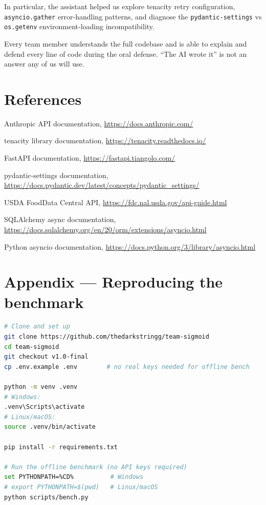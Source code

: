 \documentclass[11pt,a4paper]{article}
\begin{document}
In particular, the assistant helped us explore tenacity retry configuration, \texttt{asyncio.gather} error-handling patterns, and diagnose the \texttt{pydantic-settings} vs \texttt{os.getenv} environment-loading incompatibility.

Every team member understands the full codebase and is able to explain and defend every line of code during the oral defense. ``The AI wrote it'' is not an answer any of us will use.

\section*{References}

\begin{enumerate}[label={[\arabic*]},leftmargin=2.4em,itemsep=2pt]
  \item Anthropic API documentation, \url{https://docs.anthropic.com/}
  \item tenacity library documentation, \url{https://tenacity.readthedocs.io/}
  \item FastAPI documentation, \url{https://fastapi.tiangolo.com/}
  \item pydantic-settings documentation, \url{https://docs.pydantic.dev/latest/concepts/pydantic\_settings/}
  \item USDA FoodData Central API, \url{https://fdc.nal.usda.gov/api-guide.html}
  \item SQLAlchemy async documentation, \url{https://docs.sqlalchemy.org/en/20/orm/extensions/asyncio.html}
  \item Python asyncio documentation, \url{https://docs.python.org/3/library/asyncio.html}
\end{enumerate}

\appendix
\section{Appendix --- Reproducing the benchmark}

\begin{lstlisting}[style=python,language=bash,numbers=none]
# Clone and set up
git clone https://github.com/thedarkstringg/team-sigmoid
cd team-sigmoid
git checkout v1.0-final
cp .env.example .env        # no real keys needed for offline bench

python -m venv .venv
# Windows:
.venv\Scripts\activate
# Linux/macOS:
source .venv/bin/activate

pip install -r requirements.txt

# Run the offline benchmark (no API keys required)
set PYTHONPATH=%CD%          # Windows
# export PYTHONPATH=$(pwd)   # Linux/macOS
python scripts/bench.py
\end{lstlisting}
\end{document}
